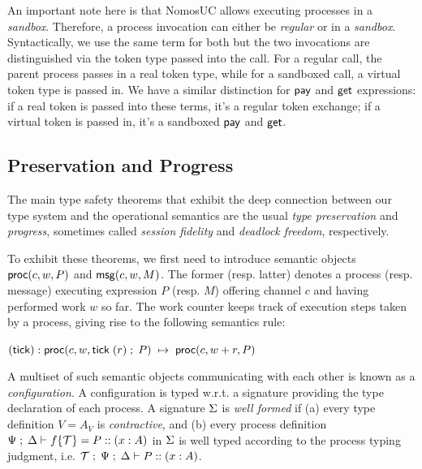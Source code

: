 An important note here is that NomosUC allows executing processes in
a \emph{sandbox}.
Therefore, a process invocation can either be \emph{regular} or in a
\emph{sandbox}.
Syntactically, we use the same term for both but the two invocations
are distinguished via the token type passed into the call.
For a regular call, the parent process passes in a real token type,
while for a sandboxed call, a virtual token type is passed in.
We have a similar distinction for $\mathsf{pay}$ and $\mathsf{get}$ expressions:
if a real token is passed into these terms, it's a regular token
exchange; if a virtual token is passed in, it's a sandboxed $\mathsf{pay}$
and $\mathsf{get}$.

\subsection{Preservation and Progress}
The main type safety theorems that exhibit the deep connection between our type
system and the operational semantics are the usual \emph{type
preservation} and \emph{progress}, sometimes called \emph{session
fidelity} and \emph{deadlock freedom}, respectively.

To exhibit these theorems, we first need to introduce semantic objects
$\mathsf{proc}(c, w, P)$ and $\mathsf{msg}(c, w, M)$.
The former (resp. latter) denotes a process (resp. message) executing
expression $P$ (resp. $M$) offering channel $c$ and having performed
work $w$ so far.
The work counter keeps track of execution steps taken by a process,
giving rise to the following semantics rule:
\begin{tabbing}
  $(\mathsf{tick}) : \mathsf{proc}(c, w, \mathsf{tick} \; (r) \; ; \; P) \; \mapsto \; \mathsf{proc}(c, w+r, P)$
\end{tabbing}
A multiset of such semantic objects communicating with each other
is known as a \emph{configuration}.
A configuration is typed w.r.t. a signature providing the type declaration
of each process.
A signature $\Sigma$ is \emph{well formed} if
(a) every type definition $V = A_V$ is \emph{contractive},
and (b) every process definition
$\Psi \; ; \; \Delta \vdash f \{\mathcal{T}\} = P :: (x : A)$ in $\Sigma$
is well typed according to the process typing judgment, i.e.
$\mathcal{T} \; ; \; \Psi \; ; \; \Delta \vdash P :: (x : A)$.
 
